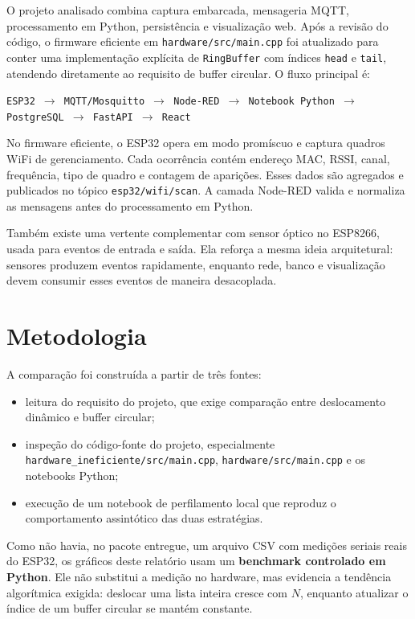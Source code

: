 \documentclass[12pt,a4paper]{article}
\begin{document}
O projeto analisado combina captura embarcada, mensageria MQTT, processamento em Python, persistência e visualização web. Após a revisão do código, o firmware eficiente em \texttt{hardware/src/main.cpp} foi atualizado para conter uma implementação explícita de \texttt{RingBuffer} com índices \texttt{head} e \texttt{tail}, atendendo diretamente ao requisito de buffer circular. O fluxo principal é:

\begin{center}
\texttt{ESP32 $\rightarrow$ MQTT/Mosquitto $\rightarrow$ Node-RED $\rightarrow$ Notebook Python $\rightarrow$ PostgreSQL $\rightarrow$ FastAPI $\rightarrow$ React}
\end{center}

No firmware eficiente, o ESP32 opera em modo promíscuo e captura quadros WiFi de gerenciamento. Cada ocorrência contém endereço MAC, RSSI, canal, frequência, tipo de quadro e contagem de aparições. Esses dados são agregados e publicados no tópico \texttt{esp32/wifi/scan}. A camada Node-RED valida e normaliza as mensagens antes do processamento em Python.

Também existe uma vertente complementar com sensor óptico no ESP8266, usada para eventos de entrada e saída. Ela reforça a mesma ideia arquitetural: sensores produzem eventos rapidamente, enquanto rede, banco e visualização devem consumir esses eventos de maneira desacoplada.

\section{Metodologia}

A comparação foi construída a partir de três fontes:

\begin{itemize}
    \item leitura do requisito do projeto, que exige comparação entre deslocamento dinâmico e buffer circular;
    \item inspeção do código-fonte do projeto, especialmente \texttt{hardware\_ineficiente/src/main.cpp}, \texttt{hardware/src/main.cpp} e os notebooks Python;
    \item execução de um notebook de perfilamento local que reproduz o comportamento assintótico das duas estratégias.
\end{itemize}

Como não havia, no pacote entregue, um arquivo CSV com medições seriais reais do ESP32, os gráficos deste relatório usam um \textbf{benchmark controlado em Python}. Ele não substitui a medição no hardware, mas evidencia a tendência algorítmica exigida: deslocar uma lista inteira cresce com $N$, enquanto atualizar o índice de um buffer circular se mantém constante.
\end{document}
